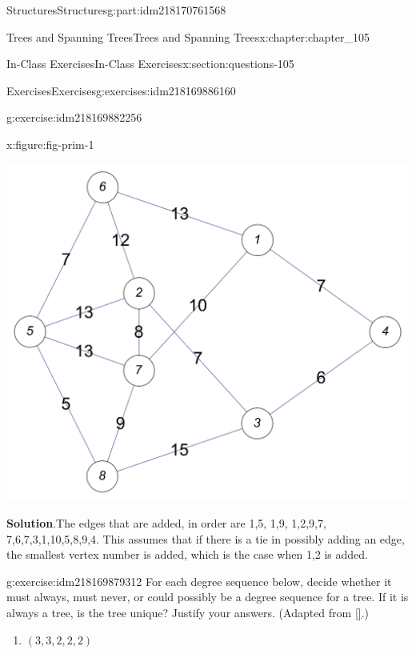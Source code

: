 \documentclass[oneside,10pt,]{book}
\newcommand{\blocktitlefont}{\relax}
\newcommand{\xreffont}{\relax}
\numberwithin{equation}{section}
\begin{document}
\begin{partptx}{Structures}{}{Structures}{}{}{g:part:idm218170761568}
\begin{chapterptx}{Trees and Spanning Trees}{}{Trees and Spanning Trees}{}{}{x:chapter:chapter_105}
\begin{sectionptx}{In-Class Exercises}{}{In-Class Exercises}{}{}{x:section:questions-105}
\begin{exercises-subsection-numberless}{Exercises}{}{Exercises}{}{}{g:exercises:idm218169886160}
\begin{exercisegroup}
\begin{divisionexerciseeg}{4}{}{}{g:exercise:idm218169882256}
\begin{figureptx}{}{x:figure:fig-prim-1}{}%
\begin{image}{0.175}{0.65}{0.175}%
\includegraphics[width=\linewidth]{images/fig-prim-1.png}
\end{image}%
\tcblower
\end{figureptx}%
\par\smallskip%
\noindent\textbf{\blocktitlefont Solution}.\hypertarget{g:solution:idm218169879808}{}\quad{}The edges that are added, in order are \textbraceleft{}1,5\textbraceright{}, \textbraceleft{}1,9\textbraceright{}, \textbraceleft{}1,2\textbraceright{},\textbraceleft{}9,7\textbraceright{}, \textbraceleft{}7,6\textbraceright{},\textbraceleft{}7,3\textbraceright{},\textbraceleft{}1,10\textbraceright{},\textbraceleft{}5,8\textbraceright{},\textbraceleft{}9,4\textbraceright{}.  This assumes that if there is a tie in possibly adding an edge, the smallest vertex number is added, which is the case when \textbraceleft{}1,2\textbraceright{} is added.%
\end{divisionexerciseeg}%
\begin{divisionexerciseeg}{5}{}{}{g:exercise:idm218169879312}%
For each degree sequence below, decide whether it must always, must never, or could possibly be a degree sequence for a tree.  If it is always a tree, is the tree unique?  Justify your answers. (Adapted from \hyperlink{x:biblio:biblio-levin-2020}{[{\xreffont 3}]}.)%
\begin{enumerate}[label=(\alph*)]
\item{}\(\displaystyle (3, 3, 2, 2, 2)\)%

\end{enumerate}
\end{divisionexerciseeg}
\end{exercisegroup}
\end{exercises-subsection-numberless}
\end{sectionptx}
\end{chapterptx}
\end{partptx}
\end{document}
